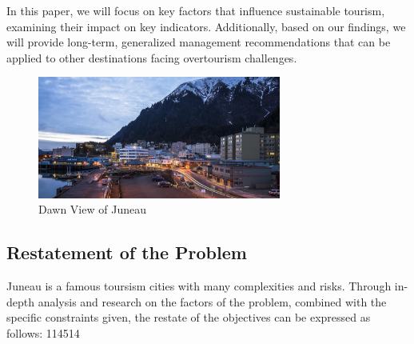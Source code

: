 \documentclass[UTF8]{mcmthesis}
\begin{document}
            In this paper, we will focus on key factors that influence sustainable tourism, examining their impact on key indicators. Additionally, based on our findings, we will provide long-term, generalized management recommendations that can be applied to other destinations facing overtourism challenges.

            \begin{figure}[htbp]
                \centering
                \includegraphics[width=8cm]{figure1.png}
                \caption{Dawn View of Juneau}
            \end{figure}
        
        \subsection{Restatement of the Problem}
        \hspace*{2em}Juneau is a famous toursism cities with many complexities and risks. Through in-depth analysis and research on the factors of the problem, combined with the specific constraints given, the restate of the objectives can be expressed as follows:
114514
\end{document}
